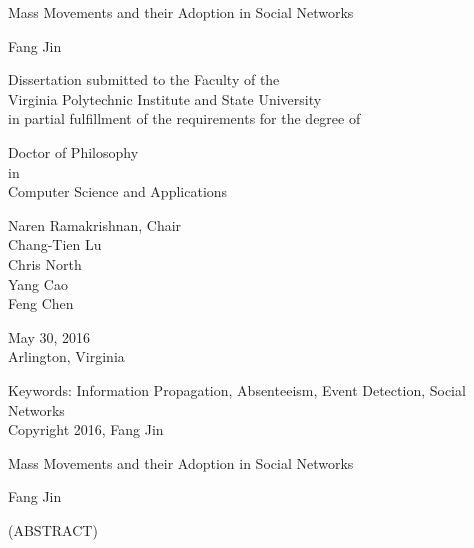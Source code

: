 \documentclass[12pt,dvips]{report}
\begin{document}
\thispagestyle{empty}
\begin{center}

{\Large
Mass Movements and their Adoption in Social Networks
}


\vfill

Fang Jin

\vfill

Dissertation submitted to the Faculty of the \\
Virginia Polytechnic Institute and State University \\
in partial fulfillment of the requirements for the degree of

\vfill

Doctor of Philosophy \\
in \\
Computer Science and Applications

\vfill

Naren Ramakrishnan, Chair \\
Chang-Tien Lu \\
Chris North \\
Yang Cao \\
Feng Chen

\vfill

May 30, 2016 \\
Arlington, Virginia

\vfill

Keywords: Information Propagation, Absenteeism, Event Detection, Social Networks
\\
Copyright 2016, Fang Jin

\end{center}

\pagebreak

\thispagestyle{empty}
\begin{center}

{\large
Mass Movements and their Adoption in Social Networks
}

\vfill

Fang Jin

\vfill

(ABSTRACT)
\vfill

\end{center}
\end{document}
